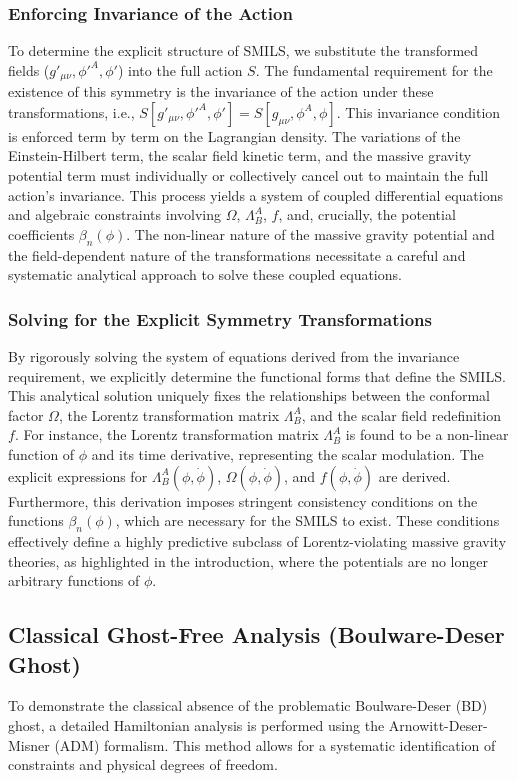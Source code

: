 \documentclass[twocolumn]{aastex631}
\begin{document}
\subsubsection{Enforcing Invariance of the Action}
To determine the explicit structure of SMILS, we substitute the transformed fields ($g'_{\mu\nu}, \phi'^A, \phi'$) into the full action $S$. The fundamental requirement for the existence of this symmetry is the invariance of the action under these transformations, i.e., $S[g'_{\mu\nu}, \phi'^A, \phi'] = S[g_{\mu\nu}, \phi^A, \phi]$. This invariance condition is enforced term by term on the Lagrangian density.
The variations of the Einstein-Hilbert term, the scalar field kinetic term, and the massive gravity potential term must individually or collectively cancel out to maintain the full action's invariance. This process yields a system of coupled differential equations and algebraic constraints involving $\Omega$, $\Lambda^A_B$, $f$, and, crucially, the potential coefficients $\beta_n(\phi)$. The non-linear nature of the massive gravity potential and the field-dependent nature of the transformations necessitate a careful and systematic analytical approach to solve these coupled equations.

\subsubsection{Solving for the Explicit Symmetry Transformations}
By rigorously solving the system of equations derived from the invariance requirement, we explicitly determine the functional forms that define the SMILS. This analytical solution uniquely fixes the relationships between the conformal factor $\Omega$, the Lorentz transformation matrix $\Lambda^A_B$, and the scalar field redefinition $f$. For instance, the Lorentz transformation matrix $\Lambda^A_B$ is found to be a non-linear function of $\phi$ and its time derivative, representing the scalar modulation. The explicit expressions for $\Lambda^A_B(\phi, \dot{\phi})$, $\Omega(\phi, \dot{\phi})$, and $f(\phi, \dot{\phi})$ are derived. Furthermore, this derivation imposes stringent consistency conditions on the functions $\beta_n(\phi)$, which are necessary for the SMILS to exist. These conditions effectively define a highly predictive subclass of Lorentz-violating massive gravity theories, as highlighted in the introduction, where the potentials are no longer arbitrary functions of $\phi$.

\subsection{Classical Ghost-Free Analysis (Boulware-Deser Ghost)}
To demonstrate the classical absence of the problematic Boulware-Deser (BD) ghost, a detailed Hamiltonian analysis is performed using the Arnowitt-Deser-Misner (ADM) formalism. This method allows for a systematic identification of constraints and physical degrees of freedom.
\end{document}
